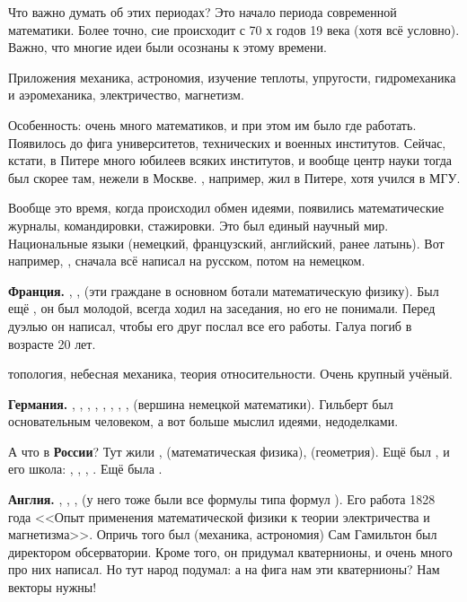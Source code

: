 \documentclass[a4paper,oneside,fleqn,10pt]{article}
\begin{document}
Что важно думать об этих периодах? Это начало периода современной математики.
Более точно, сие происходит с 70 х годов 19 века (хотя всё условно).
Важно, что многие идеи были осознаны к этому времени.

Приложения механика, астрономия, изучение теплоты, упругости, гидромеханика и аэромеханика,
электричество, магнетизм.

Особенность: очень много математиков, и при этом им было где работать. Появилось
до фига университетов, технических и военных институтов. Сейчас, кстати, в Питере много юбилеев
всяких институтов, и вообще центр науки тогда был скорее там, нежели в Москве.
, например, жил в Питере, хотя учился в МГУ.

Вообще это время, когда происходил обмен идеями, появились математические журналы,
командировки, стажировки. Это был единый научный мир. Национальные языки (немецкий, французский, английский,
ранее латынь). Вот например, , сначала всё написал на русском, потом на немецком.

\textbf{Франция.} , ,  (эти граждане в основном ботали математическую физику).
Был ещё , он был молодой, всегда ходил на заседания,  но его не понимали.
Перед дуэлью он написал, чтобы его друг послал  все его работы.
Галуа погиб в возрасте 20 лет.

 топология, небесная механика, теория относительности. Очень крупный учёный.

\textbf{Германия.} , , , , ,
, , ,  (вершина
немецкой математики). Гильберт был основательным человеком, а вот  больше мыслил идеями,
недоделками.

А что в \textbf{России}? Тут жили ,  (математическая физика),
 (геометрия). Ещё был , и его школа: ,
, , . Ещё была .

\textbf{Англия.} , , , 
(у него тоже были все формулы типа формул ).
Его работа 1828 года <<Опыт применения математической физики к теории электричества и магнетизма>>.
Опричь того был  (механика, астрономия) Сам Гамильтон был директором обсерватории.
Кроме того, он придумал кватернионы, и очень много про них написал.
Но тут народ подумал: а на фига нам эти кватернионы? Нам векторы нужны!
\end{document}
